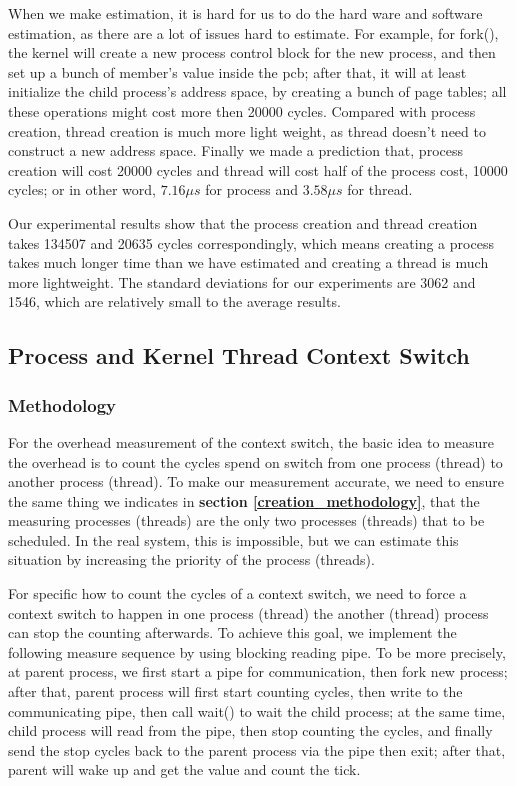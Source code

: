 When we make estimation, it is hard for us to do the hard ware and software estimation, as there are a lot of issues hard to estimate. For example, for fork(), the kernel will create a new process control block for the new process, and then set
up a bunch of member's value inside the pcb; after that, it will at least initialize the child process's address space, by creating a bunch of page tables; all these operations might cost more then 20000 cycles. Compared with process creation,
thread creation is much more light weight, as thread doesn't need to construct a new address space. Finally we made a prediction that, process creation will cost 20000 cycles and thread will cost half of the process cost, 10000 cycles; or in other
word, $7.16 \mu s$ for process and $3.58 \mu s$ for thread.

Our experimental results show that the process creation and thread creation takes 134507 and 20635 cycles correspondingly, which means creating a process takes much longer time than we have estimated and creating a thread is much more lightweight. The standard deviations for our experiments are 3062 and 1546, which are relatively small to the average results.


\subsection{Process and Kernel Thread Context Switch}

\subsubsection{Methodology}

For the overhead measurement of the context switch, the basic idea to measure the overhead is to count the cycles spend on switch from one process (thread) to another process (thread). To make our measurement accurate, we need to ensure the same thing we indicates in
\textbf{section \ref{creation_methodology}}, that the measuring processes (threads) are the only two processes (threads) that to be scheduled. In the real system, this is impossible, but we can estimate this situation by increasing the priority of the process (threads).

For specific how to count the cycles of a context switch, we need to force a context switch to happen in one process (thread) the another (thread) process can stop the counting afterwards. To achieve this goal, we implement the following measure sequence by using blocking
reading pipe. To be more precisely, at parent process, we first start a pipe for communication, then fork new process; after that, parent process will first start counting cycles, then write to the communicating pipe, then call wait() to wait the child process; at the same time, child process will read from the pipe, then stop counting the cycles, and finally send the stop cycles back to the parent process via the pipe then exit; after that, parent will wake up and get the value and count the tick.

